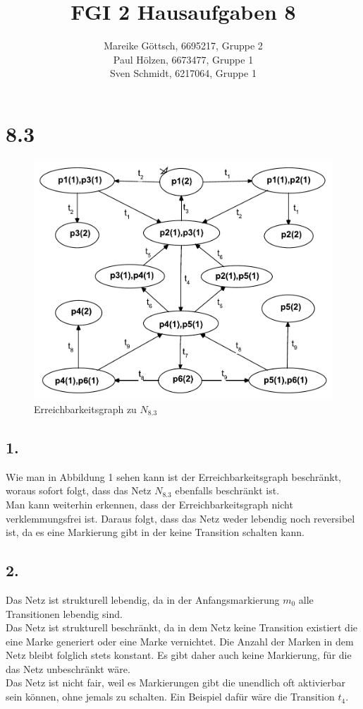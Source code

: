 \documentclass[12pt, paper=a4]{article}
\author{Mareike G\"ottsch, 6695217, Gruppe 2\\Paul H\"olzen, 6673477, Gruppe 1\\Sven Schmidt, 6217064, Gruppe 1}
\title{FGI 2 Hausaufgaben 8}
\begin{document}
\maketitle
\section*{8.3}
\begin{figure}[h!]
	\includegraphics*[scale = 0.7]{Erreichbarkeitsgraph_8_3.pdf}
	\caption{Erreichbarkeitsgraph zu $N_{8.3}$}
\end{figure}
\subsection*{1.}
Wie man in Abbildung 1 sehen kann ist der  Erreichbarkeitsgraph beschränkt, woraus sofort folgt, dass das Netz $N_{8.3}$ ebenfalls beschränkt ist.\\
Man kann weiterhin erkennen, dass der Erreichbarkeitsgraph nicht verklemmungsfrei ist. Daraus folgt, dass das Netz weder lebendig noch reversibel ist, da es eine Markierung gibt in der keine Transition schalten kann.
\subsection*{2.}
Das Netz ist strukturell lebendig, da in der Anfangsmarkierung $m_{0}$ alle Transitionen lebendig sind.\\
Das Netz ist strukturell beschränkt, da in dem Netz keine Transition existiert die eine Marke generiert oder eine Marke vernichtet. Die Anzahl der Marken in dem Netz bleibt folglich stets konstant. Es gibt daher auch keine Markierung, für die das Netz unbeschränkt wäre.\\
Das Netz ist nicht fair, weil es Markierungen gibt die unendlich oft aktivierbar sein können, ohne jemals zu schalten. Ein Beispiel dafür wäre die Transition $t_{4}$.
\end{document}
